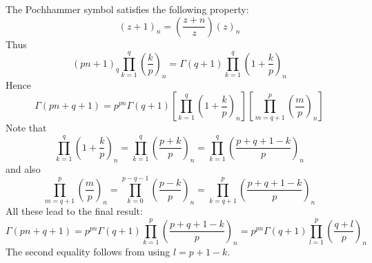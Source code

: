 The Pochhammer symbol satisfies the following property:
\begin{equation}
	(z+1)_{n} = \left(\frac{z+n}{z}\right) \left(z\right)_{n}
\end{equation}
Thus
\begin{equation}
	\left(pn+1\right)_{q} \prod_{k = 1}^{q} \left(\frac{k}{p}\right)_{n} = \Gamma(q + 1) \prod_{k = 1}^{q} \left(1 + \frac{k}{p}\right)_{n}
\end{equation}
Hence
\begin{equation}
	\Gamma(pn+q+1) = p^{pn} \Gamma(q+1) \left[\prod_{k = 1}^{q} \left(1 + \frac{k}{p}\right)_{n}\right] \left[\prod_{m = q+1}^{p} \left(\frac{m}{p}\right)_{n}\right]
\end{equation}
Note that
\begin{equation}
    \prod_{k = 1}^{q} \left(1 + \frac{k}{p} \right)_{n} = \prod_{k = 1}^{q} \left(\frac{p + k}{p}\right)_{n} = \prod_{k=1}^{q} \left(\frac{p + q + 1 - k}{p}\right)_{n}
\end{equation}
and also
\begin{equation}
    \prod_{m = q+1}^{p} \left(\frac{m}{p}\right)_{n} = \prod_{k = 0}^{p-q-1} \left(\frac{p - k}{p}\right)_{n} = \prod_{k = q + 1}^{p} \left(\frac{p + q + 1 - k}{p}\right)_{n}
\end{equation}
All these lead to the final result:
\begin{equation}
    \Gamma(pn+q+1) = p^{pn} \Gamma(q+1) \prod_{k = 1}^{p} \left(\frac{p+q+1-k}{p}\right)_{n} = p^{pn} \Gamma(q+1) \prod_{l=1}^{p} \left(\frac{q+l}{p}\right)_{n}
\end{equation}
The second equality follows from using $l = p + 1 - k$.

